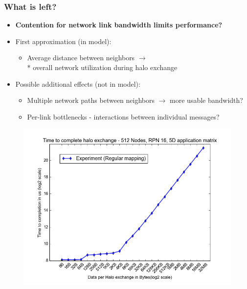 \documentclass{beamer}
\begin{document}
\begin{frame}
\frametitle{What is left?}
\begin{itemize}
  \item \textbf{Contention for network link bandwidth limits performance?}
  \item First approximation (in model):
  \begin{itemize}
    \item Average distance between neighbors $\rightarrow$ \\*
          overall network utilization during halo exchange 
  \end{itemize}
  \item Possible additional effects (not in model):
  \begin{itemize}
    \item Multiple network paths between neighbors $\rightarrow$
           more usable bandwidth?
    \item Per-link bottlenecks - interactions
          between individual messages?
  \end{itemize}
\end{itemize}
\vspace{-0.5em}
\begin{figure}
\includegraphics[width=0.5\linewidth]{time_vs_data_regular.png}
\end{figure}
\end{frame}
\end{document}
